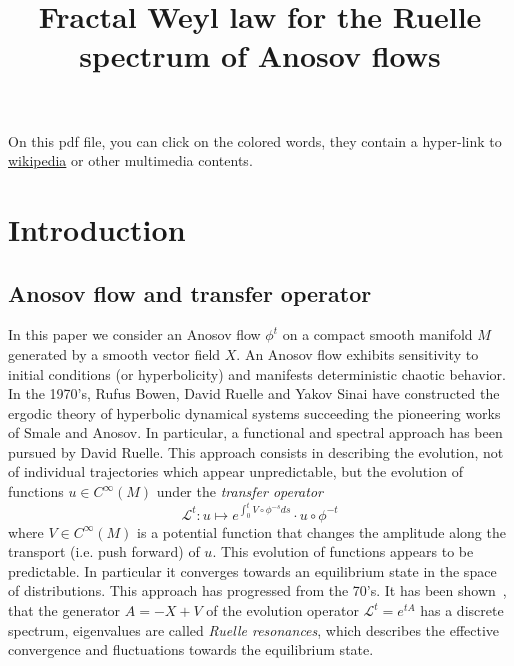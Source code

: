 \documentclass[AHL,Unicode,longabstracts,published]{cedram}
\title[Fractal Weyl law for the Ruelle spectrum]{Fractal Weyl law for the Ruelle spectrum of Anosov flows}
\author[\initial{F.} \lastname{Faure}]{\firstname{Fr\'ed\'eric} \lastname{Faure}}
\author[\initial{M.} \lastname{Tsujii}]{\firstname{Masato} \lastname{Tsujii}}
\newcommand{\clL}{\mathcal{L}}
\begin{document}
\maketitle
\setcounter{tocdepth}{2}
\tableofcontents{}

\begin{rema}
On this pdf file, you can click on the colored words, they contain a hyper-link to \href{https://en.wikipedia.org/wiki/Main_Page}{wikipedia} or other multimedia contents.
\end{rema}



\section{Introduction}

\subsection*{Anosov flow and transfer operator}

In this paper we consider an Anosov flow $\phi^{t}$ on a compact smooth manifold $M$ generated by a smooth vector field $X$. An Anosov flow exhibits sensitivity to initial conditions (or hyperbolicity) and manifests deterministic chaotic behavior. In the 1970's, Rufus Bowen, David Ruelle and Yakov Sinai have constructed the ergodic theory of hyperbolic dynamical systems succeeding the pioneering works of Smale and Anosov. In particular, a functional and spectral approach has been pursued by David Ruelle. This approach consists in describing the evolution, not of individual trajectories which appear unpredictable, but the evolution of functions $u\in C^{\infty}(M)$ under the \emph{transfer operator}
\[
\clL^{t}:u\mapsto e^{\int_{0}^{t}V\circ\phi^{-s}ds}\cdot u\circ\phi^{-t}
\]
where $V\in C^{\infty}(M)$ is a potential function that changes the amplitude along the transport (i.e. push forward) of $u$. This evolution of functions appears to be predictable. In particular it converges towards an equilibrium state in the space of distributions. This approach has progressed from the 70's. It has been shown~\cite{Baladi05,liverani_02,liverani_butterley_07,baladi_05,dyatlov_guillarmou_2014,fred-RP-06,fred-roy-sjostrand-07,fred_flow_09,liverani_04}, that the generator $A=-X+V$ of the evolution operator $\clL^{t}=e^{tA}$ has a discrete spectrum, eigenvalues are called\emph{ Ruelle resonances}, which describes the effective convergence and fluctuations towards the equilibrium state.
\end{document}
